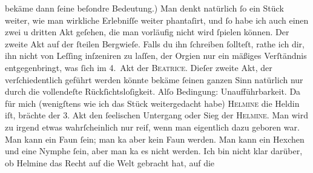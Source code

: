 \begin{ledgroupsized}[t]{13cm}
               bekäme dann ſeine beſondre Bedeutung.)\pend
           \pstart
           Man denkt natürlich ſo ein Stück weiter, wie man wirkliche Erlebniſſe weiter
               phantaſirt, und ſo habe ich auch einen zwei u dritten Akt geſehen, die man vorläufig nicht wird ſpielen können. Der
               zweite Akt auf der ſteilen Bergwieſe. Falls du ihn ſchreiben ſollteſt, rathe ich dir,
               ihn nicht von Leſſing inſzeniren zu laſſen, der
               Orgien nur ein mäßiges Verſtändnis entgegenbringt, was {\pb}ſich im 4. Akt der \textsc{Beatrice}\label{K_L01604_1v}\label{K_L01604_1h}. Dieſer zweite
               Akt, der verſchiedentlich geführt werden könnte bekäme ſeinen ganzen Sinn natürlich
               nur durch die vollendeſte Rückſichtsloſigkeit. Alſo Bedingung: Unaufführbarkeit. Da
               für mich (wenigſtens wie ich das Stück weitergedacht habe) \textsc{Helmine} die Heldin iſt, brächte der 3. Akt den ſeelischen Untergang oder Sieg der \textsc{Helmine}. Man wird zu irgend etwas wahrſcheinlich nur reif, wenn man eigentlich dazu
               geboren war. Man kann ein Faun ſein; man ka{\geminationn}{ }{\pb}aber kein Faun werden.
               Man kann ein Hexchen und eine Nymphe ſein, aber man ka{\geminationn}
               es nicht werden. Ich bin nicht klar darüber, ob Helmine das Recht auf die Welt gebracht hat, auf die

\end{ledgroupsized}

